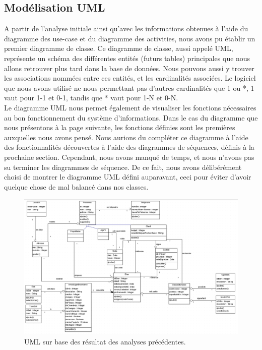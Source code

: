 \mbox{}
\subsection{Modélisation UML}
A partir de l'analyse initiale ainsi qu'avec les informations obtenues à l'aide du diagramme des use-case et du diagramme des activities, nous avons pu établir un premier diagramme de classe. Ce diagramme de classe, aussi appelé UML, représente un schéma des différentes entités (futurs tables) principales que nous allons retrouver plus tard dans la base de données. Nous pouvons aussi y trouver les associations nommées entre ces entités, et les cardinalités associées. Le logiciel que nous avons utilisé ne nous permettant pas d'autres cardinalités que 1 ou *, 1 vaut pour 1-1 et 0-1, tandis que * vaut pour 1-N et 0-N.\\

Le diagramme UML nous permet également de visualiser les fonctions nécessaires au bon fonctionnement du système d'informations. Dans le cas du diagramme que nous présentons à la page suivante, les fonctions définies sont les premières auxquelles nous avons pensé. Nous aurions du compléter ce diagramme à l'aide des fonctionnalités découvertes à l'aide des diagrammes de séquences, définis à la prochaine section. Cependant, nous avons manqué de temps, et nous n'avons pas su terminer les diagrammes de séquence. De ce fait, nous avons délibérément choisi de montrer le diagramme UML défini auparavant, ceci pour éviter d'avoir quelque chose de mal balancé dans nos classes.


\newpage
\begin{landscape}
\begin{figure}[H]
\centering
\includegraphics[width=23cm]{uml.png}
\caption{UML sur base des résultat des analyses précédentes.}
\label{fig:uml}
\end{figure}
\end{landscape}
